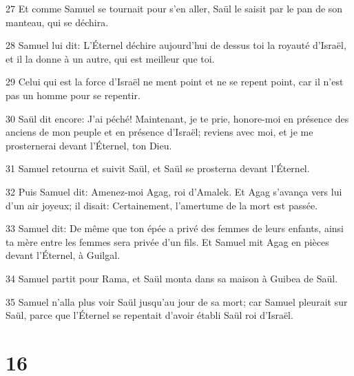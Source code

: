 \par 27 Et comme Samuel se tournait pour s'en aller, Saül le saisit par le pan de son manteau, qui se déchira.
\par 28 Samuel lui dit: L'Éternel déchire aujourd'hui de dessus toi la royauté d'Israël, et il la donne à un autre, qui est meilleur que toi.
\par 29 Celui qui est la force d'Israël ne ment point et ne se repent point, car il n'est pas un homme pour se repentir.
\par 30 Saül dit encore: J'ai péché! Maintenant, je te prie, honore-moi en présence des anciens de mon peuple et en présence d'Israël; reviens avec moi, et je me prosternerai devant l'Éternel, ton Dieu.
\par 31 Samuel retourna et suivit Saül, et Saül se prosterna devant l'Éternel.
\par 32 Puis Samuel dit: Amenez-moi Agag, roi d'Amalek. Et Agag s'avança vers lui d'un air joyeux; il disait: Certainement, l'amertume de la mort est passée.
\par 33 Samuel dit: De même que ton épée a privé des femmes de leurs enfants, ainsi ta mère entre les femmes sera privée d'un fils. Et Samuel mit Agag en pièces devant l'Éternel, à Guilgal.
\par 34 Samuel partit pour Rama, et Saül monta dans sa maison à Guibea de Saül.
\par 35 Samuel n'alla plus voir Saül jusqu'au jour de sa mort; car Samuel pleurait sur Saül, parce que l'Éternel se repentait d'avoir établi Saül roi d'Israël.

\chapter{16}


